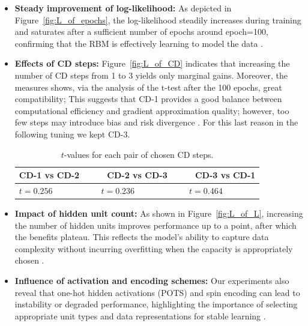 \documentclass[prl,twocolumn]{revtex4-1}
\begin{document}
\begin{itemize}
\item \textbf{Steady improvement of log-likelihood:} As depicted in Figure~\ref{fig:L_of_epochs}, the log-likelihood steadily increases during training and saturates after a sufficient number of epochs around epoch=100, confirming that the RBM is effectively learning to model the data \cite{bortoletto,practical}.
\item \textbf{Effects of CD steps:} Figure~\ref{fig:L_of_CD} indicates that increasing the number of CD steps from 1 to 3 yields only marginal gains. Moreover, the measures shows, via the analysis of the t-test after the 100 epochs, great compatibility; This suggests that CD-1 provides a good balance between computational efficiency and gradient approximation quality; however, too few steps may introduce bias and risk divergence \cite{bortoletto,practical}. For this last reason in the following tuning we kept CD-3.

\begin{table}[!h]
	\begin{center}
		\begin{tabular}{lll}
			CD-1 vs CD-2\ \ &\ \  CD-2 vs CD-3\ \ &\ \ CD-3 vs CD-1 \\
			\hline
			$t = 0.256$ & $\ \ t = 0.236$ & $\ \ t = 0.464$
		\end{tabular}
	\end{center}
	\caption{$t$-values for each pair of chosen CD steps.}
	\label{tab:1}
\end{table}

\item
\textbf{Impact of hidden unit count:} As shown in Figure~\ref{fig:L_of_L}, increasing the number of hidden units improves performance up to a point, after which the benefits plateau. This reflects the model's ability to capture data complexity without incurring overfitting when the capacity is appropriately chosen \cite{bortoletto,practical}.
\item
\textbf{Influence of activation and encoding schemes:} Our experiments also reveal that one-hot hidden activations (POTS) and spin encoding can lead to instability or degraded performance, highlighting the importance of selecting appropriate unit types and data representations for stable learning \cite{bortoletto,practical}.
\end{itemize}
\end{document}
